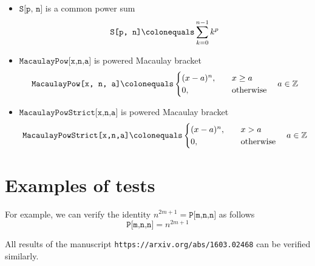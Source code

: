 \documentclass[12pt, letterpaper]{amsart}
\newenvironment{myitemize}
{ \begin{itemize}
    \setlength{\itemsep}{4pt}
    \setlength{\parskip}{4pt}
    \setlength{\parsep}{4pt}     }
{ \end{itemize}                  }
\newcommand \coeffH [4][H]{\texttt{#1[#2,#3,#4]}}
\newcommand \coeffX [4][X]{\texttt{#1[#2,#3,#4]}}
\newcommand \mynotationFixed [4][P]{\texttt{#1[#2,#3,#4]}}
\theoremstyle{definition}
\theoremstyle{remark}
\numberwithin{equation}{section}
\begin{document}
\begin{myitemize}
\begin{equation*}
\coeffX{m}{t}{j} \colonequals (-1)^m \sum_{k=1}^{2m-t+1} \coeffH{m}{t}{k} \cdot \texttt{j}^k
\end{equation*}
\item $\texttt{S[p, n]}$ is a common power sum
\begin{equation*}
\texttt{S[p, n]} \colonequals \sum_{k=0}^{n-1} k^p
\end{equation*}
\item $\texttt{MacaulayPow[x,n,a]}$ is powered Macaulay bracket
\begin{equation*}
\label{MacaulayPow}
\texttt{MacaulayPow[x, n, a]} \colonequals
\begin{cases}
(x-a)^n, &\quad x\geq a \\
0, &\quad \mathrm{otherwise}
\end{cases} \quad a\in\mathbb{Z}
\end{equation*}
\item $\texttt{MacaulayPowStrict[x,n,a]}$ is powered Macaulay bracket
\begin{equation*}
\label{MacaulayPowStrict}
\texttt{MacaulayPowStrict[x,n,a]} \colonequals
\begin{cases}
(x-a)^n, &\quad x>a \\
0, &\quad \mathrm{otherwise}
\end{cases}  \quad a\in\mathbb{Z}
\end{equation*}
\end{myitemize}
\section{Examples of tests}
For example, we can verify the identity $n^{2m+1}=\mynotationFixed{m}{n}{n}$ as follows
$$\mynotationFixed{m}{n}{n}=n^{2m+1}$$

All results of the manuscript \texttt{https://arxiv.org/abs/1603.02468} can be verified similarly.
\end{document}

